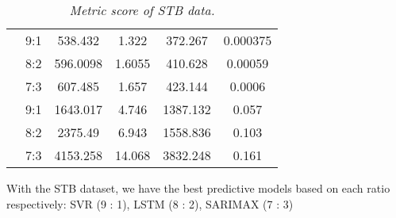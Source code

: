 \documentclass{ieeeojies}
\begin{document}
\begin{table}[H]
\begin{tabular}{|c|c|c|c|c|c|}
\rowcolor[HTML]{FFB6AF} 
\cellcolor[HTML]{FFB6AF}{\color[HTML]{000000} }                                                                                         & {\color[HTML]{000000} 9:1}            & {\color[HTML]{000000} 538.432}       & {\color[HTML]{000000} 1.322}         & {\color[HTML]{000000} 372.267}      & {\color[HTML]{000000} 0.000375}      \\ \cline{2-6} 
\rowcolor[HTML]{FFB6AF} 
\cellcolor[HTML]{FFB6AF}{\color[HTML]{000000} }                                                                                         & {\color[HTML]{000000} 8:2}            & {\color[HTML]{000000} 596.0098}      & {\color[HTML]{000000} 1.6055}        & {\color[HTML]{000000} 410.628}      & {\color[HTML]{000000} 0.00059}       \\ \cline{2-6} 
\rowcolor[HTML]{FFB6AF} 
\multirow{-3}{*}{\cellcolor[HTML]{FFB6AF}{\color[HTML]{000000} \textbf{SARIMAX}}}                                                       & {\color[HTML]{FE0000} 7:3}            & {\color[HTML]{FE0000} 607.485}       & {\color[HTML]{FE0000} 1.657}         & {\color[HTML]{FE0000} 423.144}      & {\color[HTML]{FE0000} 0.0006}        \\ \hline
\rowcolor[HTML]{FBC193} 
\cellcolor[HTML]{FBC193}{\color[HTML]{000000} }                                                                                         & {\color[HTML]{000000} 9:1}            & {\color[HTML]{000000} 1643.017}      & {\color[HTML]{000000} 4.746}         & {\color[HTML]{000000} 1387.132}     & {\color[HTML]{000000} 0.057}         \\ \cline{2-6} 
\rowcolor[HTML]{FBC193} 
\cellcolor[HTML]{FBC193}{\color[HTML]{000000} }                                                                                         & {\color[HTML]{000000} 8:2}            & {\color[HTML]{000000} 2375.49}       & {\color[HTML]{000000} 6.943}         & {\color[HTML]{000000} 1558.836}     & {\color[HTML]{000000} 0.103}         \\ \cline{2-6} 
\rowcolor[HTML]{FBC193} 
\multirow{-3}{*}{\cellcolor[HTML]{FBC193}{\color[HTML]{000000} \textbf{FCN}}}                                                           & {\color[HTML]{000000} 7:3}            & {\color[HTML]{000000} 4153.258}      & {\color[HTML]{000000} 14.068}        & {\color[HTML]{000000} 3832.248}     & {\color[HTML]{000000} 0.161}         \\ \hline
\end{tabular}
\caption{\centering \textit{Metric score of STB data.}}
\end{table}
\vspace{-0.5cm}
With the STB dataset, we have the best predictive models based on each ratio respectively: SVR (9 : 1), LSTM (8 : 2), SARIMAX (7 : 3)
\end{document}
